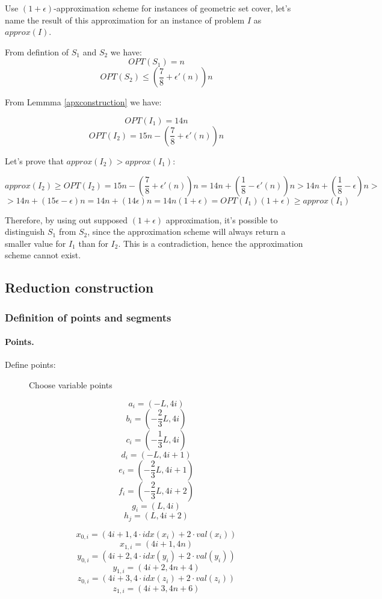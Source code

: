 Use $(1+\epsilon)$-approximation scheme for instances of geometric
set cover, let's name the result of this approximation
for an instance of problem $I$ as $approx(I)$.

From defintion of $S_1$ and $S_2$ we have:
$$OPT(S_1) = n$$
$$OPT(S_2) \le (\frac{7}{8} + \epsilon'(n))n$$

From Lemmma \ref{apxconstruction} we have:

$$OPT(I_1) = 14n$$
$$OPT(I_2) = 15n - (\frac{7}{8} + \epsilon'(n))n$$

Let's prove that $approx(I_2) > approx(I_1)$:

$$approx(I_2) \ge OPT(I_2) = 15n - (\frac{7}{8} + \epsilon'(n))n
	= 14n + (\frac{1}{8} - \epsilon'(n))n
	> 14n + (\frac{1}{8} - \epsilon)n > $$
$$	> 14n + (15\epsilon - \epsilon)n
	= 14n + (14\epsilon)n
	= 14n(1+\epsilon)
	= OPT(I_1)(1+\epsilon) \ge approx(I_1)$$ 



Therefore, by using out supposed $(1+\epsilon)$ approximation,
it’s possible to distinguish $S_1$ from $S_2$, since
the approximation scheme will always return a smaller value
for $I_1$ than for $I_2$. This is a contradiction,
hence the approximation scheme cannot exist.

\subsection{Reduction construction}
\subsubsection{Definition of points and segments}

\paragraph{Points.}

Define points:
\begin{figure}[h]
\centering
\def\svgwidth{\columnwidth}

\caption{Choose variable points}
\label{fig:apx_choose_variable}

\end{figure}

	$$a_{i} = (-L, 4i)$$
	$$b_{i} = (-\frac{2}{3}L, 4i)$$
	$$c_{i} = (-\frac{1}{3}L, 4i)$$
	$$d_{i} = (-L, 4i+1)$$
	$$e_{i} = (-\frac{2}{3}L, 4i+1)$$
	$$f_{i} = (-\frac{2}{3}L, 4i+2)$$
	$$g_i = (L, 4i)$$
	$$h_j = (L, 4i+2)$$
	
	$$x_{0, i} = (4i+1, 4\cdot idx(x_i) + 2\cdot val(x_i))$$
	$$x_{1, i} = (4i+1, 4n)$$
	$$y_{0, i} = (4i+2, 4\cdot idx(y_i) + 2\cdot val(y_i))$$
	$$y_{1, i} = (4i+2, 4n + 4)$$	
	$$z_{0, i} = (4i+3, 4\cdot idx(z_i) + 2\cdot val(z_i))$$
	$$z_{1, i} = (4i+3, 4n + 6)$$
	
